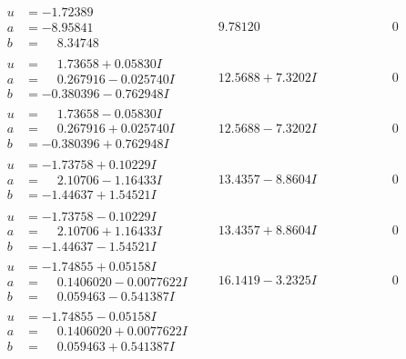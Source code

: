 \documentclass[1p]{elsarticle_modified}
\theoremstyle{definition}
\begin{document}
$$\begin{array}{c|c|c}
\begin{aligned}
u &= -1.72389\phantom{ +0.000000I} \\
a &= -8.95841\phantom{ +0.000000I} \\
b &= \phantom{-}8.34748\phantom{ +0.000000I}\end{aligned}
 & \phantom{-}9.78120\phantom{ +0.000000I} & \phantom{-0.000000 } 0 \\ \hline\begin{aligned}
u &= \phantom{-}1.73658 + 0.05830 I \\
a &= \phantom{-}0.267916 - 0.025740 I \\
b &= -0.380396 - 0.762948 I\end{aligned}
 & \phantom{-}12.5688 + 7.3202 I & \phantom{-0.000000 } 0 \\ \hline\begin{aligned}
u &= \phantom{-}1.73658 - 0.05830 I \\
a &= \phantom{-}0.267916 + 0.025740 I \\
b &= -0.380396 + 0.762948 I\end{aligned}
 & \phantom{-}12.5688 - 7.3202 I & \phantom{-0.000000 } 0 \\ \hline\begin{aligned}
u &= -1.73758 + 0.10229 I \\
a &= \phantom{-}2.10706 - 1.16433 I \\
b &= -1.44637 + 1.54521 I\end{aligned}
 & \phantom{-}13.4357 - 8.8604 I & \phantom{-0.000000 } 0 \\ \hline\begin{aligned}
u &= -1.73758 - 0.10229 I \\
a &= \phantom{-}2.10706 + 1.16433 I \\
b &= -1.44637 - 1.54521 I\end{aligned}
 & \phantom{-}13.4357 + 8.8604 I & \phantom{-0.000000 } 0 \\ \hline\begin{aligned}
u &= -1.74855 + 0.05158 I \\
a &= \phantom{-}0.1406020 - 0.0077622 I \\
b &= \phantom{-}0.059463 - 0.541387 I\end{aligned}
 & \phantom{-}16.1419 - 3.2325 I & \phantom{-0.000000 } 0 \\ \hline\begin{aligned}
u &= -1.74855 - 0.05158 I \\
a &= \phantom{-}0.1406020 + 0.0077622 I \\
b &= \phantom{-}0.059463 + 0.541387 I\end{aligned}

\end{array}$$
\end{document}
